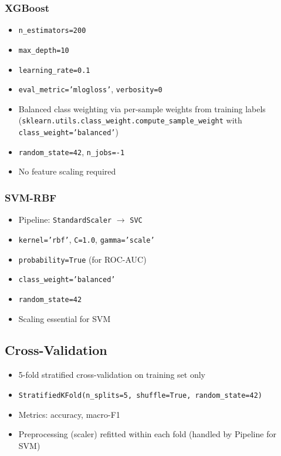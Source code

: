 \subsubsection{XGBoost}
\begin{itemize}
    \item \texttt{n\_estimators=200}
    \item \texttt{max\_depth=10}
    \item \texttt{learning\_rate=0.1}
    \item \texttt{eval\_metric='mlogloss'}, \texttt{verbosity=0}
    \item Balanced class weighting via per-sample weights from training labels (\texttt{sklearn.utils.class\_weight.compute\_sample\_weight} with \texttt{class\_weight='balanced'})
    \item \texttt{random\_state=42}, \texttt{n\_jobs=-1}
    \item No feature scaling required
\end{itemize}

\subsubsection{SVM-RBF}
\begin{itemize}
    \item Pipeline: \texttt{StandardScaler} $\rightarrow$ \texttt{SVC}
    \item \texttt{kernel='rbf'}, \texttt{C=1.0}, \texttt{gamma='scale'}
    \item \texttt{probability=True} (for ROC-AUC)
    \item \texttt{class\_weight='balanced'}
    \item \texttt{random\_state=42}
    \item Scaling essential for SVM
\end{itemize}

\subsection{Cross-Validation}
\begin{itemize}
    \item 5-fold stratified cross-validation on training set only
    \item \texttt{StratifiedKFold(n\_splits=5, shuffle=True, random\_state=42)}
    \item Metrics: accuracy, macro-F1
    \item Preprocessing (scaler) refitted within each fold (handled by Pipeline for SVM)
\end{itemize}

